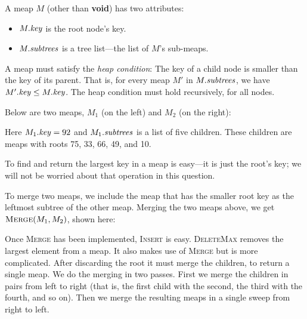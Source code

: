 \documentclass[11pt]{article}
\newcommand{\id}[1]{\mbox{\textit{#1}}}
\begin{document}
A meap $M$ (other than \textbf{void}) has two attributes:
\begin{itemize}
\setlength{\itemsep}{-0.5ex}
\item $M.\id{key}$ is the root node's key.
\item $M.\id{subtrees}$ is a tree list---the list of $M$'s sub-meaps.
\end{itemize}
A meap must satisfy the \emph{heap condition}:
The key of a child node is smaller than the key of its parent.
That is, for every meap $M'$ in $M.\id{subtrees}$,
we have $M'.\id{key} \leq M.\id{key}$.
The heap condition must hold recursively, for all nodes.

Below are two meaps, $M_1$ (on the left) and $M_2$ (on the right):
\begin{center}
\qquad \qquad
{}
\end{center}

\vspace{1ex}\noindent
Here $M_1.\id{key} = 92$ and $M_1.\id{subtrees}$ is a list of five children.
These children are meaps with roots 75, 33, 66, 49, and 10.

To find and return the largest key in a meap is easy---it is just the root's
key; we will not be worried about that operation in this question.

To merge two meaps, we include the meap that has the smaller root key
as the leftmost subtree of the other meap.
Merging the two meaps above, we get $\textsc{Merge}(M_1,M_2)$,
shown here:
\begin{center}
\end{center}

\vspace{1ex}\noindent
Once \textsc{Merge} has been implemented, \textsc{Insert} is easy.
\textsc{DeleteMax} removes the largest element from a meap.
It also makes use of \textsc{Merge} but is more complicated.
After discarding the root it must merge the children, to return a
single meap.
We do the merging in two passes.
First we merge the children in pairs from left to right
(that is, the first child with the second, the third with the fourth,
and so on).
Then we merge the resulting meaps in a single sweep from right to left.
\end{document}
